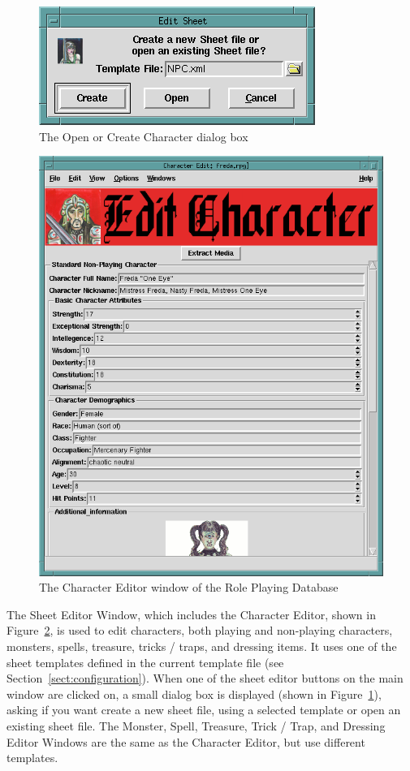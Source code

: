 \begin{figure}[hbpt]
\begin{centering}
\includegraphics{CreateOrOpenChar.png}
\caption{The Open or Create Character dialog box}
\label{fig:opencreatechar}
\end{centering}
\end{figure}
\begin{figure}[hbpt] 
\begin{centering}
\includegraphics[width=5in]{CharacterEditor.png} 
\caption{The Character Editor window of the Role Playing Database} 
\label{fig:char}
\end{centering} 
\end{figure} 
The Sheet Editor Window, which includes the Character Editor, shown in
Figure~\ref{fig:char}, is used to edit characters, both playing and
non-playing characters, monsters, spells, treasure, tricks / traps, and
dressing items.  It uses one of the sheet templates defined in the
current template file (see Section~\ref{sect:configuration}).  When one
of the sheet editor buttons on the main window are clicked on, a small
dialog box is displayed (shown in Figure~\ref{fig:opencreatechar}),
asking if you want create a new sheet file, using a selected template
or open an existing sheet file. The Monster, Spell, Treasure,  Trick /
Trap, and Dressing Editor Windows are the same as the Character Editor,
but use different templates.

